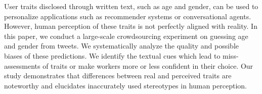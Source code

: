User traits disclosed through written text, such as age and gender, can be used to personalize applications such as recommender systems or conversational agents. However, human perception of these traits is not perfectly aligned with reality. In this paper, we conduct a large-scale crowdsourcing experiment on guessing age and gender from tweets. We systematically analyze the quality and possible biases of these predictions. We identify the textual cues which lead to miss-assessments of traits or make workers more or less confident in their choice. Our study demonstrates that differences between real and perceived traits are noteworthy and elucidates inaccurately used stereotypes in human perception.
